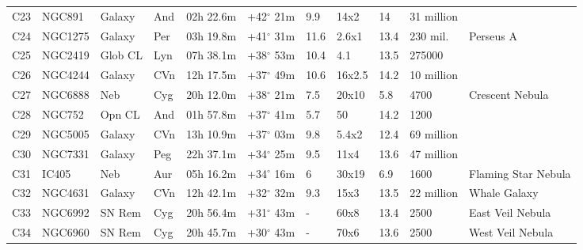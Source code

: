 \begin{longtable}{@{}lllllllllll@{}}
C23        & NGC891      & Galaxy     & And       & 02h 22.6m & +42$^{\circ}$ 21m  & 9.9       & 14x2                 & 14       & 31 million          &                                 \\
C24        & NGC1275     & Galaxy     & Per       & 03h 19.8m & +41$^{\circ}$ 31m  & 11.6      & 2.6x1                & 13.4     & 230 mil.            & Perseus A                       \\
C25        & NGC2419     & Glob CL    & Lyn       & 07h 38.1m & +38$^{\circ}$ 53m  & 10.4      & 4.1                  & 13.5     & 275000              &                                 \\
C26        & NGC4244     & Galaxy     & CVn       & 12h 17.5m & +37$^{\circ}$ 49m  & 10.6      & 16x2.5               & 14.2     & 10 million          &                                 \\
C27        & NGC6888     & Neb        & Cyg       & 20h 12.0m & +38$^{\circ}$ 21m  & 7.5       & 20x10                & 5.8      & 4700                & Crescent Nebula                 \\
C28        & NGC752      & Opn CL     & And       & 01h 57.8m & +37$^{\circ}$ 41m  & 5.7       & 50                   & 14.2     & 1200                &                                 \\
C29        & NGC5005     & Galaxy     & CVn       & 13h 10.9m & +37$^{\circ}$ 03m  & 9.8       & 5.4x2                & 12.4     & 69 million          &                                 \\
C30        & NGC7331     & Galaxy     & Peg       & 22h 37.1m & +34$^{\circ}$ 25m  & 9.5       & 11x4                 & 13.6     & 47 million          &                                 \\
C31        & IC405       & Neb        & Aur       & 05h 16.2m & +34$^{\circ}$ 16m  & 6         & 30x19                & 6.9      & 1600                & Flaming Star Nebula             \\
C32        & NGC4631     & Galaxy     & CVn       & 12h 42.1m & +32$^{\circ}$ 32m  & 9.3       & 15x3                 & 13.5     & 22 million          & Whale Galaxy                    \\
C33        & NGC6992    & SN Rem     & Cyg       & 20h 56.4m & +31$^{\circ}$ 43m  & -         & 60x8                 & 13.4     & 2500                & East Veil Nebula                \\
C34        & NGC6960     & SN Rem     & Cyg       & 20h 45.7m & +30$^{\circ}$ 43m  & -         & 70x6                 & 13.6     & 2500                & West Veil Nebula                \\

\end{longtable}
